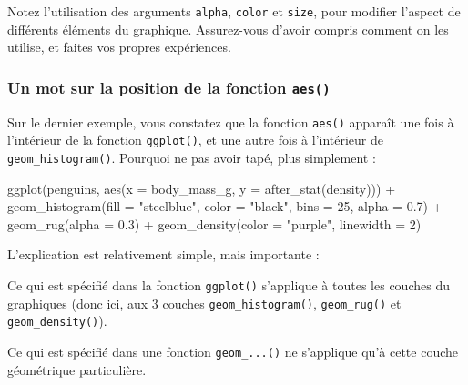\documentclass[
  a4paper,
  DIV=11,
  numbers=noendperiod,
  oneside]{scrreprt}
\newenvironment{Shaded}{}{}
\newcommand{\AttributeTok}[1]{\textcolor[rgb]{0.84,0.23,0.29}{#1}}
\newcommand{\DecValTok}[1]{\textcolor[rgb]{0.00,0.36,0.77}{#1}}
\newcommand{\FloatTok}[1]{\textcolor[rgb]{0.00,0.36,0.77}{#1}}
\newcommand{\FunctionTok}[1]{\textcolor[rgb]{0.44,0.26,0.76}{#1}}
\newcommand{\NormalTok}[1]{\textcolor[rgb]{0.14,0.16,0.18}{#1}}
\newcommand{\SpecialCharTok}[1]{\textcolor[rgb]{0.00,0.36,0.77}{#1}}
\newcommand{\StringTok}[1]{\textcolor[rgb]{0.01,0.18,0.38}{#1}}
\begin{document}
Notez l'utilisation des arguments \texttt{alpha}, \texttt{color} et
\texttt{size}, pour modifier l'aspect de différents éléments du
graphique. Assurez-vous d'avoir compris comment on les utilise, et
faites vos propres expériences.

\subsubsection{\texorpdfstring{Un mot sur la position de la fonction
\texttt{aes()}}{Un mot sur la position de la fonction aes()}}\label{un-mot-sur-la-position-de-la-fonction-aes}

Sur le dernier exemple, vous constatez que la fonction \texttt{aes()}
apparaît une fois à l'intérieur de la fonction \texttt{ggplot()}, et une
autre fois à l'intérieur de \texttt{geom\_histogram()}. Pourquoi ne pas
avoir tapé, plus simplement :

\begin{Shaded}
\begin{Highlighting}[]
\FunctionTok{ggplot}\NormalTok{(penguins, }\FunctionTok{aes}\NormalTok{(}\AttributeTok{x =}\NormalTok{ body\_mass\_g, }\AttributeTok{y =} \FunctionTok{after\_stat}\NormalTok{(density))) }\SpecialCharTok{+}
  \FunctionTok{geom\_histogram}\NormalTok{(}\AttributeTok{fill =} \StringTok{"steelblue"}\NormalTok{, }\AttributeTok{color =} \StringTok{"black"}\NormalTok{,}
                 \AttributeTok{bins =} \DecValTok{25}\NormalTok{, }\AttributeTok{alpha =} \FloatTok{0.7}\NormalTok{) }\SpecialCharTok{+}
  \FunctionTok{geom\_rug}\NormalTok{(}\AttributeTok{alpha =} \FloatTok{0.3}\NormalTok{) }\SpecialCharTok{+}
  \FunctionTok{geom\_density}\NormalTok{(}\AttributeTok{color =} \StringTok{"purple"}\NormalTok{, }\AttributeTok{linewidth =} \DecValTok{2}\NormalTok{)}
\end{Highlighting}
\end{Shaded}

L'explication est relativement simple, mais importante :

\begin{tcolorbox}[enhanced jigsaw, arc=.35mm, opacityback=0, colbacktitle=quarto-callout-important-color!10!white, bottomrule=.15mm, coltitle=black, colframe=quarto-callout-important-color-frame, breakable, toprule=.15mm, title=\textcolor{quarto-callout-important-color}{\faExclamation}\hspace{0.5em}{Important}, leftrule=.75mm, titlerule=0mm, bottomtitle=1mm, toptitle=1mm, left=2mm, rightrule=.15mm, opacitybacktitle=0.6, colback=white]

Ce qui est spécifié dans la fonction \texttt{ggplot()} s'applique à
toutes les couches du graphiques (donc ici, aux 3 couches
\texttt{geom\_histogram()}, \texttt{geom\_rug()} et
\texttt{geom\_density()}).

Ce qui est spécifié dans une fonction \texttt{geom\_...()} ne s'applique
qu'à cette couche géométrique particulière.

\end{tcolorbox}
\end{document}
